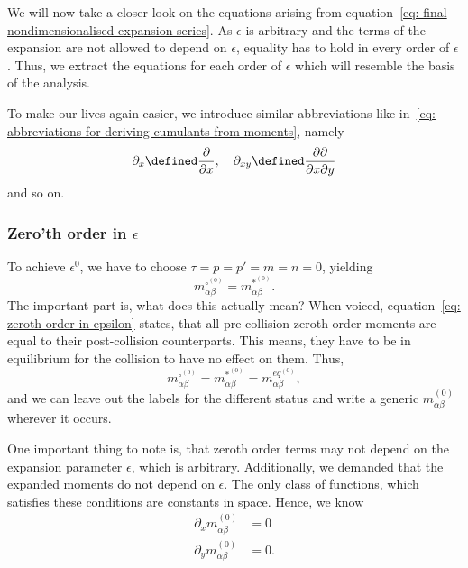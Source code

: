 We will now take a closer look on the equations arising from equation~\eqref{eq: final nondimensionalised expansion series}.
As $\epsilon$ is arbitrary and the terms of the expansion are not allowed to depend on $\epsilon$, equality has to hold in every order of $\epsilon$.
Thus, we extract the equations for each order of $\epsilon$ which will resemble the basis of the analysis.

To make our lives again easier, we introduce similar abbreviations like in~\eqref{eq: abbreviations for deriving cumulants from moments}, namely
\begin{equation}
  \partial_x \defined \frac{\partial}{\partial x}, \quad
  \partial_{xy} \defined \frac{\partial\partial}{\partial x\partial y}
\end{equation}
and so on.

\subsubsection{Zero'th order in \texorpdfstring{$\epsilon$}{epsilon}}
\label{subs: Zeroth order in epsilon}

To achieve $\epsilon^0$, we have to choose $\tau=p=p'=m=n=0$, yielding
\begin{equation}
  \label{eq: zeroth order in epsilon}
  m_{\alpha\beta}^{\circ^{(0)}} = m_{\alpha\beta}^{*^{(0)}}.
\end{equation}
The important part is, what does this actually mean?
When voiced, equation~\eqref{eq: zeroth order in epsilon} states, that all pre-collision zeroth order moments are equal to their post-collision counterparts.
This means, they have to be in equilibrium for the collision to have no effect on them.
Thus,
\begin{equation}
  \label{eq: zeroth order invariant}
  m_{\alpha\beta}^{\circ^{(0)}} = m_{\alpha\beta}^{*^{(0)}} = m_{\alpha\beta}^{eq^{(0)}},
\end{equation}
and we can leave out the labels for the different status and write a generic $m_{\alpha\beta}^{(0)}$ wherever it occurs.

One important thing to note is, that zeroth order terms may not depend on the expansion parameter $\epsilon$, which is arbitrary.
Additionally, we demanded that the expanded moments do not depend on $\epsilon$.
The only class of functions, which satisfies these conditions are constants in space.
Hence, we know
\begin{equation}
  \label{eq: derivative of zeroth order}
  \begin{aligned}
    \partial_x m_{\alpha\beta}^{(0)} &= 0 \\
    \partial_y m_{\alpha\beta}^{(0)} &= 0.
  \end{aligned}
\end{equation}

